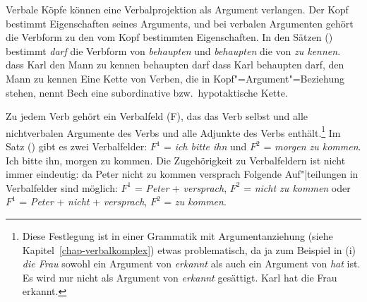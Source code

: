 
Verbale Köpfe können eine Verbalprojektion als Argument verlangen. Der Kopf bestimmt
Eigenschaften seines Arguments, und bei verbalen Argumenten gehört die Verbform zu 
den vom Kopf bestimmten Eigenschaften. In den Sätzen () bestimmt \emph{darf}
die Verbform von \emph{behaupten} und \emph{behaupten} die von \emph{zu kennen}.
\eal
\ex dass Karl den Mann zu kennen behaupten darf
\ex dass Karl behaupten darf, den Mann zu kennen
\zl
Eine Kette von Verben, die in Kopf"=Argument"=Beziehung stehen, nennt Bech eine subordinative
bzw.\ hypotaktische Kette.%
%
%
%
%


%
%
Zu jedem Verb gehört ein Verbalfeld (F), das das Verb selbst und alle nichtverbalen
Argumente des Verbs und alle Adjunkte des Verbs enthält.\footnote{
        Diese Festlegung ist in einer Grammatik mit Argumentanziehung
        (siehe Kapitel~\ref{chap-verbalkomplex}) etwas
        problematisch, da ja zum Beispiel in (i) \emph{die Frau} sowohl ein
        Argument von \emph{erkannt} als auch ein Argument von \emph{hat} ist.
        Es wird nur nicht als Argument von \emph{erkannt} gesättigt.
\ea
Karl hat die Frau erkannt.
\zlast%
}
Im Satz () gibt es zwei Verbalfelder: $F^1$ = \emph{ich bitte ihn} und $F^2$ =
\emph{morgen zu kommen}.
\ea
Ich bitte ihn, morgen zu kommen.
\z
Die Zugehörigkeit zu Verbalfeldern ist nicht immer eindeutig:
\ea
\label{zu_kommen_versprach}
da Peter nicht zu kommen versprach
\z
Folgende Auf"|teilungen in Verbalfelder sind möglich: $F^1$ = \emph{Peter} + \emph{versprach},
$F^2$ = \emph{nicht zu kommen} oder $F^1$ = \emph{Peter} + \emph{nicht} + \emph{versprach}, 
$F^2$ = \emph{zu kommen}.

